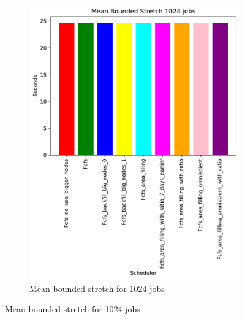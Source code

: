 \documentclass[a4paper]{article}
\begin{document}
\begin{figure}[H]
\begin{subfigure}[b]{0.4\linewidth}\centering\includegraphics[width=0.95\linewidth]{MBSS/plot/Size_Constraint_2022-01-17->2022-01-17_V85105_Mean_Stretch_With_a_Minimum_1024_450_128_32_256_4_1024.pdf}\caption{Mean bounded stretch for 1024 jobs}\label{45}\end{subfigure}

\end{figure}
\end{document}
